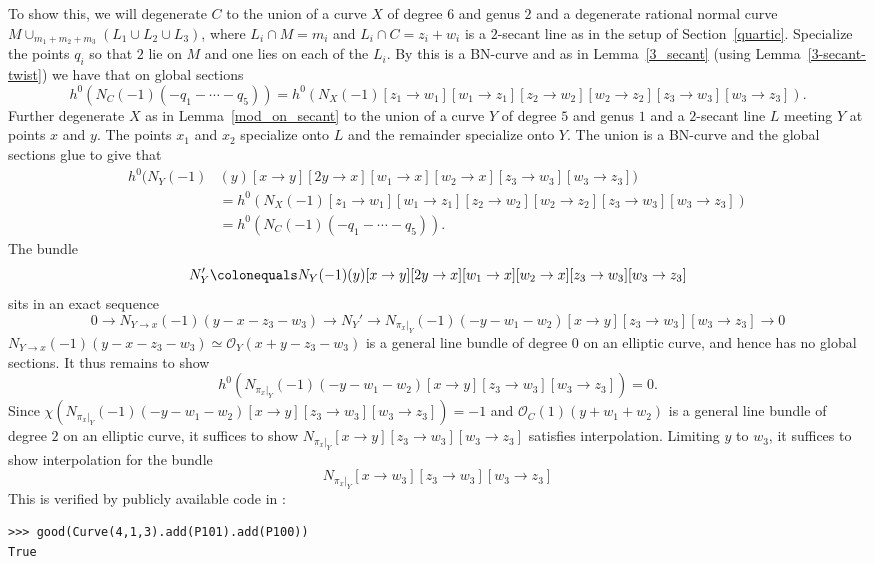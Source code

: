 \documentclass[11pt]{amsart}
\renewcommand{\O}{\mathcal{O}}
\theoremstyle{definition}
\theoremstyle{remark}
\begin{document}
To show this, we will degenerate $C$ to the union of a curve $X$ of degree $6$ and genus $2$ and a degenerate rational normal curve $M \cup_{m_1+m_2+m_3} (L_1 \cup L_2 \cup L_3)$, where $L_i \cap M= m_i$ and $L_i \cap C = z_i + w_i$ is a $2$-secant line as in the setup of Section~\ref{quartic}.  Specialize the points $q_i$ so that $2$ lie on $M$ and one lies on each of the $L_i$.  By \cite[Theorem 1.6]{rbn} this is a BN-curve and as in Lemma~\ref{3_secant} (using Lemma~\ref{3-secant-twist}) we have that on global sections 
\[h^0(N_{C}(-1)(-q_1-\cdots-q_5)) = h^0(N_X(-1)[z_1 \to w_1][w_1 \to z_1][z_2 \to w_2][w_2 \to z_2][z_3 \to w_3][w_3 \to z_3]) .\]
Further degenerate $X$ as in Lemma~\ref{mod_on_secant} to the union of a curve $Y$ of degree $5$ and genus $1$ and a $2$-secant line $L$ meeting $Y$ at points $x$ and $y$.  The points $x_1$ and $x_2$ specialize onto $L$ and the remainder specialize onto $Y$.  The union is a BN-curve and the global sections glue to give that
\begin{align*}
h^0(N_Y(-1)&(y)[x \to y][2y \to x][w_1 \to x][w_2 \to x][z_3 \to w_3][w_3 \to z_3]) \\
& =h^0(N_X(-1)[z_1 \to w_1][w_1 \to z_1][z_2 \to w_2][w_2 \to z_2][z_3 \to w_3][w_3 \to z_3]) \\
& = h^0(N_{C}(-1)(-q_1-\cdots-q_5)).
\end{align*}
The bundle
\[N_Y' \colonequals N_Y(-1)(y)[x \to y][2y \to x][w_1 \to x][w_2 \to x][z_3 \to w_3][w_3 \to z_3]\]
sits in an exact sequence
\[0 \to N_{Y \to x}(-1)(y -x - z_3 - w_3) \to N_Y' \to N_{\pi_x|_Y}(-1)(-y-w_1-w_2)[x \to y][z_3 \to w_3][w_3 \to z_3] \to 0\]
$N_{Y \to x}(-1)(y -x - z_3 - w_3) \simeq \O_Y(x + y - z_3 - w_3)$ is a general line bundle of degree $0$ on an elliptic curve, and hence has no global sections.	
It thus remains to show
\[h^0(N_{\pi_x|_Y}(-1)(-y-w_1-w_2)[x \to y][z_3 \to w_3][w_3 \to z_3]) = 0.\]
Since $\chi(N_{\pi_x|_Y}(-1)(-y-w_1-w_2)[x \to y][z_3 \to w_3][w_3 \to z_3]) = -1$
and $\O_C(1)(y + w_1 + w_2)$ is a general line bundle of degree $2$ on an elliptic curve,
it suffices to show $N_{\pi_x|_Y}[x \to y][z_3 \to w_3][w_3 \to z_3]$ satisfies interpolation.
Limiting $y$ to $w_3$, it suffices to show interpolation for the bundle
\[N_{\pi_x|_Y}[x \to w_3][z_3 \to w_3][w_3 \to z_3]\]
This is verified by publicly available code in \cite[Appendix B]{joint}:

\begin{verbatim}
>>> good(Curve(4,1,3).add(P101).add(P100))
True
\end{verbatim}



\end{document}
